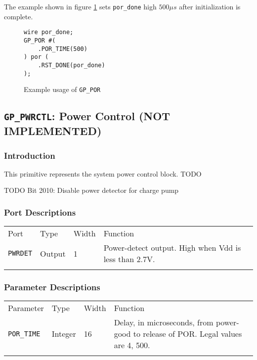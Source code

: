 \documentclass[11pt]{article}
\newcommand{\tokenstyle}[1]{\texttt{#1}}
\newcommand{\wirestyle}[1]{\texttt{#1}}
\newcommand{\whenstyle}[1]{{\fontseries{sb}\selectfont#1}}
\newcommand{\thinhline}{\Xhline{1\arrayrulewidth}}
\newcommand{\thickhline}{\Xhline{2.5\arrayrulewidth}}
\begin{document}
The example shown in figure \ref{gp-por-example} sets \wirestyle{por\_done} high $500 \mu s$ after initialization is complete.

\begin{figure}[h]
\begin{lstlisting}
wire por_done;
GP_POR #(
	.POR_TIME(500)
) por (
	.RST_DONE(por_done)
);
\end{lstlisting}
\caption{Example usage of \tokenstyle{GP\_POR}}
\label{gp-por-example}
\end{figure}


\pagebreak
\clearpage
\subsection{\tokenstyle{GP\_PWRCTL}: Power Control (NOT IMPLEMENTED)}
\label{gp-pwrctl}

\subsubsection{Introduction}
This primitive represents the system power control block. TODO


TODO
Bit 2010: Disable power detector for charge pump

\subsubsection{Port Descriptions}

\begin{tabularx}{\textwidth}{lllX}
\thinhline
\whenstyle{Port} & \whenstyle{Type} & \whenstyle{Width} & \whenstyle{Function} \\
\thickhline
\tokenstyle{PWRDET} & Output & 1 & Power-detect output. High when Vdd is less than 2.7V.\\
\thinhline
\end{tabularx}

\subsubsection{Parameter Descriptions}

\begin{tabularx}{\textwidth}{lllX}
\thinhline
\whenstyle{Parameter} & \whenstyle{Type} & \whenstyle{Width} & \whenstyle{Function} \\
\thickhline
\tokenstyle{POR\_TIME} & Integer & 16 & Delay, in microseconds, from power-good to release of POR. Legal values are 4, 500.\\
\thinhline
\end{tabularx}
\end{document}
